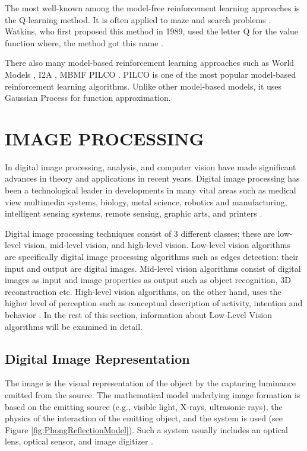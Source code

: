 The most well-known among the model-free reinforcement learning approaches is the Q-learning method. It is often applied to maze and search problems \cite{tijsma2016comparing, guo2004new, whitehead1991complexity}. Watkins, who first proposed this method in 1989, used the letter Q for the value function where, the method got this name \cite{watkins1989learning}.

There also many model-based reinforcement learning approaches such as World Models \cite{ha2018world}, I2A \cite{racaniere2017imagination}, MBMF \cite{bansal2017mbmf} PILCO \cite{deisenroth2011pilco}. PILCO is one of the most popular model-based reinforcement learning algorithms. Unlike other model-based models, it uses Gaussian Process for function approximation.

\section{IMAGE PROCESSING}

In digital image processing, analysis, and computer vision have made significant advances in theory and applications in recent years. Digital image processing has been a technological leader in developments in many vital areas such as medical view multimedia systems, biology, metal science, robotics and manufacturing, intelligent sensing systems, remote sensing, graphic arts, and printers \cite{pitas2000digital}.


Digital image processing techniques consist of 3 different classes; these are low-level vision, mid-level vision, and high-level vision. Low-level vision algorithms are specifically digital image processing algorithms such as edges detection: their input and output are digital images. Mid-level vision algorithms consist of digital images as input and image properties as output such as object recognition, 3D reconstruction etc. High-level vision algorithms, on the other hand, uses the higher level of perception such as conceptual description of activity, intention and behavior \cite{pitas2000digital, gonzalez2002digital}. In the rest of this section, information about Low-Level Vision algorithms will be examined in detail.

\subsection{Digital Image Representation}

The image is the visual representation of the object by the capturing luminance emitted from the source. The mathematical model underlying image formation is based on the emitting source (e.g., visible light, X-rays, ultrasonic rays), the physics of the interaction of the emitting object, and the system is used (see Figure \ref{fig:PhongReflectionModel}). Such a system usually includes an optical lens, optical sensor, and image digitizer \cite{pitas2000digital}.

